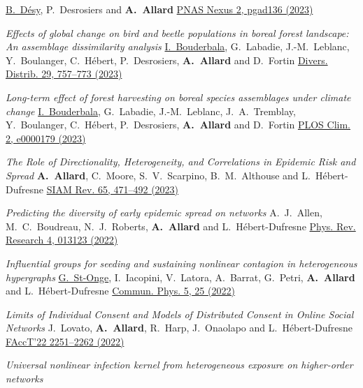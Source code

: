 \documentclass[11pt]{article}
\makeatletter
\newcommand{\reversearabic}[1]{\expandafter\@reversearabic\csname c@#1\endcsname}
\newcommand{\@reversearabic}[1]{%
  \number\numexpr\getrefnumber{this@etaremune@\romannumeral\c@etaremune}-#1+1\relax
}
\newcounter{etaremune}
\newenvironment{etaremune}[1][]{%
  \stepcounter{etaremune}%
  \begin{enumerate}[label=\reversearabic*.,#1]%
}{%
  \edef\@currentlabel{\the\csname c@\@enumctr\endcsname}%
  \label{this@etaremune@\romannumeral\c@etaremune}%
  \end{enumerate}%
}
\makeatother
\begin{document}
\begin{etaremune}[itemsep=0.5em, label={[A\reversearabic*]}]
{  \uline{B.~Désy}, P.~Desrosiers and \textbf{A.~Allard}\split
  \href{https://doi.org/10.1093/pnasnexus/pgad136}{PNAS Nexus 2, pgad136 (2023)}}
%
  \item \parbox[t]{\textwidth-30pt}{\textit{Effects of global change on bird and beetle populations in boreal forest landscape: An assemblage dissimilarity analysis}\split
  \uline{I.~Bouderbala}, G.~Labadie, J.-M.~Leblanc, Y.~Boulanger, C.~Hébert, P.~Desrosiers, \textbf{A.~Allard} and D.~Fortin\split
  \href{https://doi.org/10.1111/ddi.13697}{Divers. Distrib. 29, 757--773 (2023)}}
%
  \item \parbox[t]{\textwidth-30pt}{\textit{Long-term effect of forest harvesting on boreal species assemblages under climate change}\split
  \uline{I.~Bouderbala}, G.~Labadie, J.-M.~Leblanc, J.~A.~Tremblay, Y.~Boulanger, C.~Hébert, P.~Desrosiers, \textbf{A.~Allard} and D.~Fortin\split
  \href{https://doi.org/10.1371/journal.pclm.0000179}{PLOS Clim. 2, e0000179 (2023)}}
%
  \item \parbox[t]{\textwidth-30pt}{\textit{The Role of Directionality, Heterogeneity, and Correlations in Epidemic Risk and Spread}\split
  \textbf{A.~Allard}, C.~Moore, S.~V.~Scarpino, B.~M.~Althouse and L.~H\'ebert-Dufresne\split
  \href{https://doi.org/10.1137/20m1383811}{SIAM Rev. 65, 471--492 (2023)}}
%
  \item \parbox[t]{\textwidth-30pt}{\textit{Predicting the diversity of early epidemic spread on networks}\split
  A.~J.~Allen, M.~C.~Boudreau, N.~J.~Roberts, \textbf{A.~Allard} and L.~H\'ebert-Dufresne\split
  \href{https://doi.org/10.1103/PhysRevResearch.4.013123}{Phys. Rev. Research 4, 013123 (2022)}}
%
  \item \parbox[t]{\textwidth-30pt}{\textit{Influential groups for seeding and sustaining nonlinear contagion in heterogeneous hypergraphs}\split
  \uline{G.~St-Onge}, I.~Iacopini, V.~Latora, A.~Barrat, G.~Petri, \textbf{A.~Allard} and L.~H\'ebert-Dufresne\split
  \href{https://doi.org/10.1038/s42005-021-00788-w}{Commun. Phys. 5, 25 (2022)}}
%
  \item \parbox[t]{\textwidth-30pt}{\textit{Limits of Individual Consent and Models of Distributed Consent in Online Social Networks}\split
  J.~Lovato, \textbf{A.~Allard}, R.~Harp, J.~Onaolapo and L.~H\'ebert-Dufresne\split
  \href{https://doi.org/10.1145/3531146.3534640}{FAccT'22 2251--2262 (2022)}}
%
  \item \parbox[t]{\textwidth-30pt}{\textit{Universal nonlinear infection kernel from heterogeneous exposure on higher-order networks}\split
}
\end{etaremune}
\end{document}
